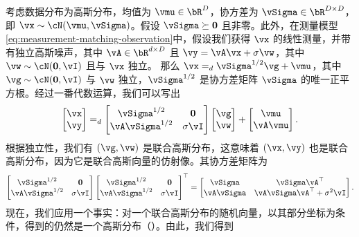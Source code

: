 \documentclass[../../book-main_zh.tex]{subfiles}
\begin{document}
\begin{example}\label{example:denoising-conditional-gaussian}
  考虑数据分布为高斯分布，均值为 $\vmu \in \bR^D$，协方差为 $\vSigma \in \bR^{D \times D}$，即 $\vx \sim \cN(\vmu, \vSigma)$。假设 $\vSigma \succeq \Zero$ 且非零。此外，在测量模型\eqref{eq:measurement-matching-observation}中，假设我们获得 $\vx$ 的线性测量，并带有独立高斯噪声，其中 $\vA \in \bR^{d \times D}$ 且 $\vy = \vA \vx + \sigma \vw$，其中 $\vw \sim \cN(\Zero, \vI)$ 且与 $\vx$ 独立。
  那么 $\vx =_{d} \vSigma^{1/2} \vg + \vmu$，其中 $\vg \sim \cN(\Zero, \vI)$ 与 $\vw$ 独立，$\vSigma^{1/2}$ 是协方差矩阵 $\vSigma$ 的唯一正平方根。经过一番代数运算，我们可以写出
  \begin{equation*}
    \begin{bmatrix}
      \vx \\
      \vy
    \end{bmatrix}
    =_{d}
    \begin{bmatrix}
      \vSigma^{1/2} & \Zero \\
      \vA \vSigma^{1/2} & \sigma \vI
    \end{bmatrix}
    \begin{bmatrix}
      \vg \\
      \vw
    \end{bmatrix}
    +
    \begin{bmatrix}
      \vmu \\
      \vA\vmu
    \end{bmatrix}.
  \end{equation*}
  根据独立性，我们有 $(\vg, \vw)$ 是联合高斯分布，这意味着 $(\vx, \vy)$ 也是联合高斯分布，因为它是联合高斯向量的仿射像。其协方差矩阵为
  \begin{equation*}
    \begin{bmatrix}
      \vSigma^{1/2} & \Zero \\
      \vA \vSigma^{1/2} & \sigma \vI
    \end{bmatrix}
    \begin{bmatrix}
      \vSigma^{1/2} & \Zero \\
      \vA \vSigma^{1/2} & \sigma \vI
    \end{bmatrix}^\top
    =
    \begin{bmatrix}
      \vSigma & \vSigma \vA^\top \\
      \vA \vSigma & \vA \vSigma \vA^\top + \sigma^2 \vI
    \end{bmatrix}.
  \end{equation*}
  现在，我们应用一个事实：对一个联合高斯分布的随机向量，以其部分坐标为条件，得到的仍然是一个高斯分布（）。由此，我们得到

\end{example}
\end{document}
